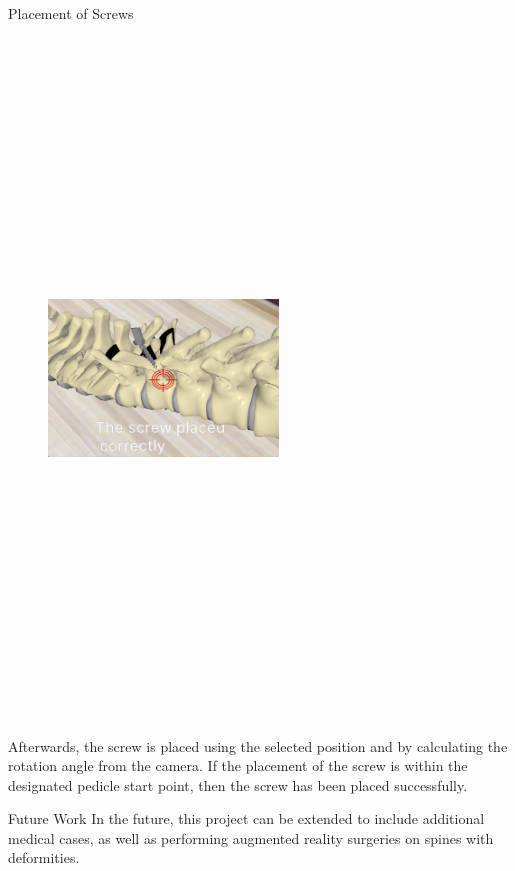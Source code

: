 \documentclass[final]{beamer}
\newlength{\onecolwid}
\begin{document}
\begin{frame}[t]
\begin{columns}[t]
\begin{column}{\onecolwid}
\begin{block}{\LARGE Placement of Screws}
\begin{figure}
\centering
\includegraphics[width=0.545\textwidth,height=18cm]{screw.png}

\end{figure}
\large
Afterwards, the screw is placed using the selected position and by calculating the rotation angle from the camera. If the placement of the screw is within the designated pedicle start point, then the screw has been placed successfully.

\end{block}


\begin{block}{\LARGE Future Work}
\large
In the future, this project can be extended to include additional medical cases, as well as performing augmented reality surgeries on spines with deformities.
\end{block}



\end{column} %

\end{columns} %

\end{frame} %
\end{document}
